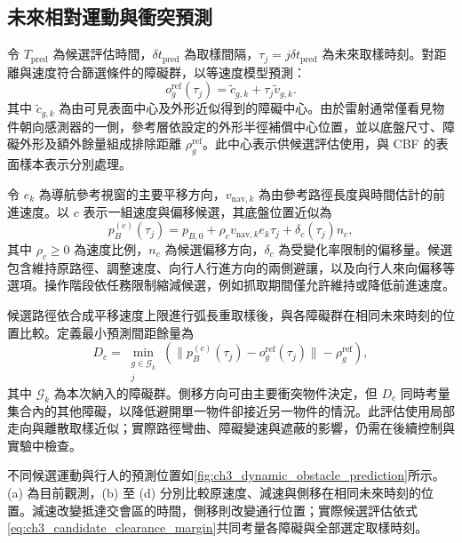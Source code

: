 \subsection{未來相對運動與衝突預測}
\label{subsec:future_motion_conflict}

令 $T_{\mathrm{pred}}$ 為候選評估時間，$\delta t_{\mathrm{pred}}$ 為取樣間隔，$\tau_j=j\delta t_{\mathrm{pred}}$ 為未來取樣時刻。對距離與速度符合篩選條件的障礙群，以等速度模型預測：
\begin{equation}
    o_g^{\mathrm{ref}}(\tau_j)
    =\tilde c_{g,k}+\tau_j\tilde v_{g,k}.
    \label{eq:ch3_reference_obstacle_prediction}
\end{equation}
其中 $\tilde c_{g,k}$ 為由可見表面中心及外形近似得到的障礙中心。由於雷射通常僅看見物件朝向感測器的一側，參考層依設定的外形半徑補償中心位置，並以底盤尺寸、障礙外形及額外餘量組成排除距離 $\rho_g^{\mathrm{ref}}$。此中心表示供候選評估使用，與 CBF 的表面樣本表示分別處理。

令 $e_k$ 為導航參考視窗的主要平移方向，$v_{\mathrm{nav},k}$ 為由參考路徑長度與時間估計的前進速度。以 $c$ 表示一組速度與偏移候選，其底盤位置近似為
\begin{equation}
    p_B^{(c)}(\tau_j)
    =p_{B,0}+\rho_c v_{\mathrm{nav},k}e_k\tau_j
      +\delta_c(\tau_j)n_c,
    \label{eq:ch3_candidate_base_motion}
\end{equation}
其中 $\rho_c\geq0$ 為速度比例，$n_c$ 為候選偏移方向，$\delta_c$ 為受變化率限制的偏移量。候選包含維持原路徑、調整速度、向行人行進方向的兩側避讓，以及向行人來向偏移等選項。操作階段依任務限制縮減候選，例如抓取期間僅允許維持或降低前進速度。

候選路徑依合成平移速度上限進行弧長重取樣後，與各障礙群在相同未來時刻的位置比較。定義最小預測間距餘量為
\begin{equation}
    D_c=
    \min_{\substack{g\in\mathcal G_k\\j}}
    \left(
      \|p_B^{(c)}(\tau_j)-o_g^{\mathrm{ref}}(\tau_j)\|
      -\rho_g^{\mathrm{ref}}
    \right),
    \label{eq:ch3_candidate_clearance_margin}
\end{equation}
其中 $\mathcal G_k$ 為本次納入的障礙群。側移方向可由主要衝突物件決定，但 $D_c$ 同時考量集合內的其他障礙，以降低避開單一物件卻接近另一物件的情況。此評估使用局部走向與離散取樣近似；實際路徑彎曲、障礙變速與遮蔽的影響，仍需在後續控制與實驗中檢查。

不同候選運動與行人的預測位置如\cref{fig:ch3_dynamic_obstacle_prediction}所示。(a) 為目前觀測，(b) 至 (d) 分別比較原速度、減速與側移在相同未來時刻的位置。減速改變抵達交會區的時間，側移則改變通行位置；實際候選評估依式\eqref{eq:ch3_candidate_clearance_margin}共同考量各障礙與全部選定取樣時刻。

